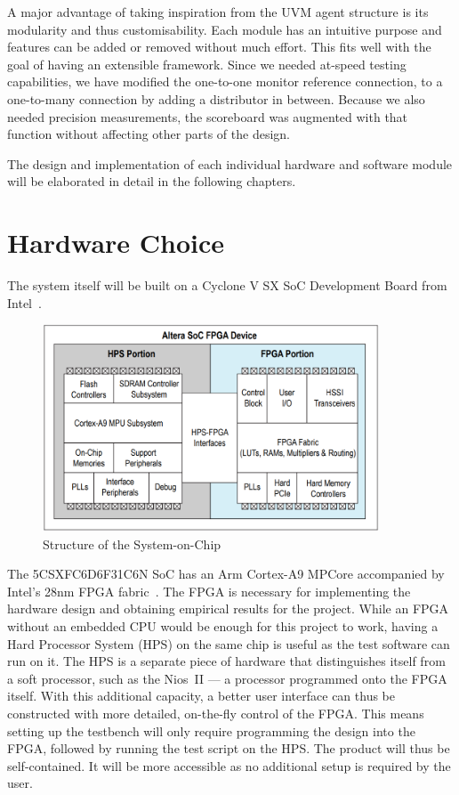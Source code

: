 A major advantage of taking inspiration from the UVM agent structure is its modularity and thus customisability.
Each module has an intuitive purpose and features can be added or removed without much effort.
This fits well with the goal of having an extensible framework.
Since we needed at-speed testing capabilities, we have modified the one-to-one monitor reference connection, to a one-to-many connection by adding a distributor in between.
Because we also needed precision measurements, the scoreboard was augmented with that function without affecting other parts of the design.

The design and implementation of each individual hardware and software module will be elaborated in detail in the following chapters.

\section{Hardware Choice}
The system itself will be built on a Cyclone V SX SoC Development Board from Intel~\cite{Intel1}.

\begin{figure}[H]
  \centering
  \includegraphics[width=10cm]{img/SoCStructure}
  \caption{Structure of the System-on-Chip}
  \label{SoCStructure}
\end{figure}

The 5CSXFC6D6F31C6N SoC has an Arm Cortex-A9 MPCore accompanied by Intel's 28nm FPGA fabric~\cite{Altera1}.
The FPGA is necessary for implementing the hardware design and obtaining empirical results for the project.
While an FPGA without an embedded CPU would be enough for this project to work, having a Hard Processor System (HPS) on the same chip is useful as the test software can run on it.
The HPS is a separate piece of hardware that distinguishes itself from a soft processor, such as the Nios~II --- a processor programmed onto the FPGA itself.
With this additional capacity, a better user interface can thus be constructed with more detailed, on-the-fly control of the FPGA.
This means setting up the testbench will only require programming the design into the FPGA, followed by running the test script on the HPS.
The product will thus be self-contained.
It will be more accessible as no additional setup is required by the user.

